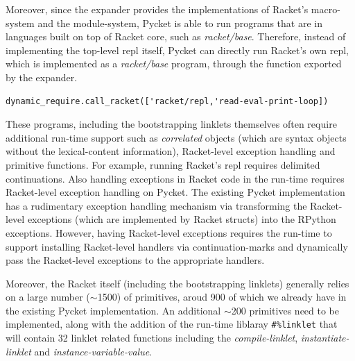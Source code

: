 Moreover, since the expander provides the implementations of Racket's
macro-system and the module-system, Pycket is able to run programs
that are in languages built on top of Racket core, such as
\emph{racket/base}. Therefore, instead of implementing the top-level
repl itself, Pycket can directly run Racket's own repl, which is
implemented as a \emph{racket/base} program, through the
 function exported by the expander.

{\footnotesize
\begin{lstlisting}[mathescape]
  dynamic_require.call_racket(['racket/repl,'read-eval-print-loop])
\end{lstlisting}
}

These programs, including the bootstrapping linklets themselves often
require additional run-time support such as \emph{correlated} objects
(which are syntax objects without the lexical-content information),
Racket-level exception handling and primitive functions. For example,
running Racket's repl requires delimited continuations. Also handling
exceptions in Racket code in the run-time requires Racket-level
exception handling on Pycket. The existing Pycket implementation has a
rudimentary exception handling mechanism via transforming the
Racket-level exceptions (which are implemented by Racket structs) into
the RPython exceptions. However, having Racket-level exceptions
requires the run-time to support installing Racket-level handlers via
continuation-marks and dynamically pass the Racket-level exceptions to
the appropriate handlers.

Moreover, the Racket itself (including the bootstrapping linklets)
generally relies on a large number ($\sim$1500) of primitives, aroud 900
of which we already have in the existing Pycket implementation. An
additional $\sim$200 primitives need to be implemented, along with the
addition of the run-time liblaray \texttt{\#\%linklet} that will
contain 32 linklet related functions including the
\emph{compile-linklet}, \emph{instantiate-linklet} and
\emph{instance-variable-value}.

